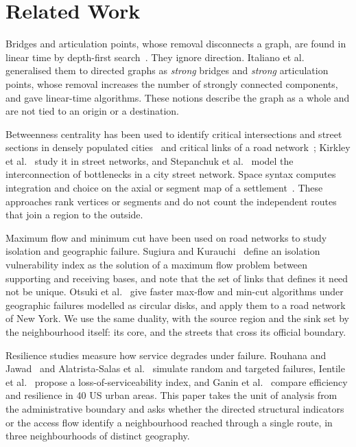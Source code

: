 \documentclass[runningheads]{llncs}
\begin{document}
\section{Related Work}
\label{sec:related}

Bridges and articulation points, whose removal disconnects a graph, are found
in linear time by depth-first search~\cite{tarjan1972depth}. They ignore
direction. Italiano et al.~\cite{italiano2012finding} generalised them to
directed graphs as \emph{strong} bridges and \emph{strong} articulation
points, whose removal increases the number of strongly connected components,
and gave linear-time algorithms. These notions describe the graph as a whole
and are not tied to an origin or a destination.

Betweenness centrality has been used to identify critical intersections and
street sections in densely populated cities~\cite{alatristasalas2019} and
critical links of a road network~\cite{bhamidipati2024}; Kirkley et
al.~\cite{kirkley2018betweenness} study it in street networks, and Stepanchuk
et al.~\cite{stepanchuk2020modelling} model the interconnection of bottlenecks
in a city street network. Space syntax computes integration and choice on the
axial or segment map of a settlement~\cite{hillier1984social}. These
approaches rank vertices or segments and do not count the independent routes
that join a region to the outside.

Maximum flow and minimum cut have been used on road networks to study
isolation and geographic failure. Sugiura and
Kurauchi~\cite{sugiura2023isolation} define an isolation vulnerability index
as the solution of a maximum flow problem between supporting and receiving
bases, and note that the set of links that defines it need not be unique.
Otsuki et al.~\cite{otsuki2016improved} give faster max-flow and min-cut
algorithms under geographic failures modelled as circular disks, and apply
them to a road network of New York. We use the same duality, with the source
region and the sink set by the neighbourhood itself: its core, and the streets
that cross its official boundary.

Resilience studies measure how service degrades under failure. Rouhana and
Jawad~\cite{rouhana2020} and Alatrista-Salas et
al.~\cite{alatristasalas2019} simulate random and targeted failures, Ientile et
al.~\cite{ientile2022measuring} propose a loss-of-serviceability index, and
Ganin et al.~\cite{ganin2017resilience} compare efficiency and resilience in
40 US urban areas. This paper takes the unit of analysis from the
administrative boundary and asks whether the directed structural indicators or
the access flow identify a neighbourhood reached through a single route, in
three neighbourhoods of distinct geography.
\end{document}
